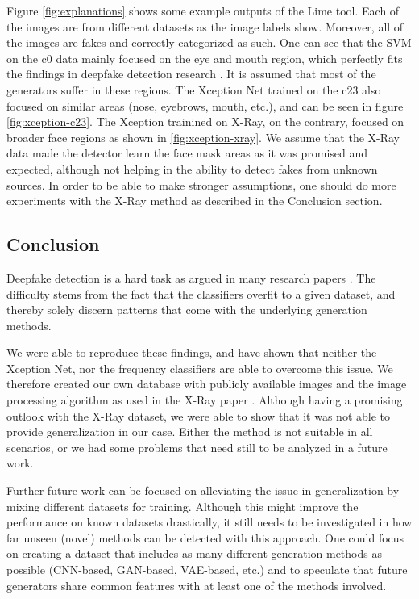 \documentclass[11pt]{article}
\begin{document}
Figure \ref{fig:explanations} shows some example outputs of the Lime tool. Each of the images are from different datasets as the image labels show. Moreover, all of the images are fakes and correctly categorized as such. One can see that the SVM on the c0 data mainly focused on the eye and mouth region, which perfectly fits the findings in deepfake detection research \cite{Mirsky2021,nguyen2021deep,Tolosana2020}. It is assumed that most of the generators suffer in these regions. The Xception Net trained on the c23 also focused on similar areas (nose, eyebrows, mouth, etc.), and can be seen in figure \ref{fig:xception-c23}. The Xception trainined on X-Ray, on the contrary, focused on broader face regions as shown in \ref{fig:xception-xray}. We assume that the X-Ray data made the detector learn the face mask areas as it was promised and expected, although not helping in the ability to detect fakes from unknown sources. In order to be able to make stronger assumptions, one should do more experiments with the X-Ray method as described in the Conclusion section.

\subsection{Conclusion}
Deepfake detection is a hard task as argued in many research papers \cite{Mirsky2021,nguyen2021deep,Tolosana2020}. The difficulty stems from the fact that the classifiers  overfit to a given dataset, and thereby solely discern patterns that come with the underlying generation methods.

We were able to reproduce these findings, and have shown that neither the Xception Net, nor the frequency classifiers are able to overcome this issue. We therefore created our own database with publicly available images and the image processing algorithm as used in the X-Ray paper \cite{li2020face}. Although having a promising outlook with the X-Ray dataset, we were able to show that it was not able to provide generalization in our case. Either the method is not suitable in all scenarios, or we had some problems that need still to be analyzed in a future work.

Further future work can be focused on alleviating the issue in generalization by mixing different datasets for training. Although this might improve the performance on known datasets drastically, it still needs to be investigated in how far unseen (novel) methods can be detected with this approach. One could focus on creating a dataset that includes as many different generation methods as possible (CNN-based, GAN-based, VAE-based, etc.) and to speculate that future generators share common features with at least one of the methods involved.
\end{document}
